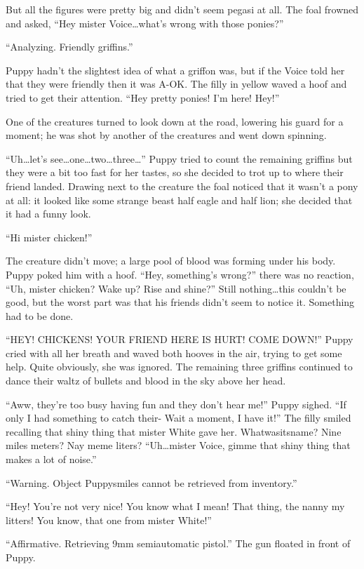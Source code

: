 But all the figures were pretty big and didn't seem pegasi at all. The foal frowned and asked, ``Hey mister Voice\dots what's wrong with those ponies?''

``{\mt Analyzing. Friendly griffins.}''

Puppy hadn't the slightest idea of what a griffon was, but if the Voice told her that they were friendly then it was A-OK. The filly in yellow waved a hoof and tried to get their attention. ``Hey pretty ponies! I'm here! Hey!''

One of the creatures turned to look down at the road, lowering his guard for a moment; he was shot by another of the creatures and went down spinning.

``Uh\dots let's see\dots one\dots two\dots three\dots'' Puppy tried to count the remaining griffins but they were a bit too fast for her tastes, so she decided to trot up to where their friend landed. Drawing next to the creature the foal noticed that it wasn't a pony at all: it looked like some strange beast half eagle and half lion; she decided that it had a funny look.

``Hi mister chicken!''

The creature didn't move; a large pool of blood was forming under his body. Puppy poked him with a hoof. ``Hey, something's wrong?'' there was no reaction, ``Uh, mister chicken? Wake up? Rise and shine?'' Still nothing\dots this couldn't be good, but the worst part was that his friends didn't seem to notice it. Something had to be done.

``HEY! CHICKENS! YOUR FRIEND HERE IS HURT! COME DOWN!'' Puppy cried with all her breath and waved both hooves in the air, trying to get some help. Quite obviously, she was ignored. The remaining three griffins continued to dance their waltz of bullets and blood in the sky above her head.

``Aww, they're too busy having fun and they don't hear me!'' Puppy sighed. ``If only I had something to catch their- Wait a moment, I have it!'' The filly smiled recalling that shiny thing that mister White gave her. Whatwasitsname? Nine miles meters? Nay meme liters? ``Uh\dots mister Voice, gimme that shiny thing that makes a lot of noise.''

``{\mt Warning. Object Puppysmiles cannot be retrieved from inventory.}''

``Hey! You're not very nice! You know what I mean! That thing, the nanny my litters! You know, that one from mister White!''

``{\mt Affirmative. Retrieving 9mm semiautomatic pistol.}'' The gun floated in front of Puppy.

